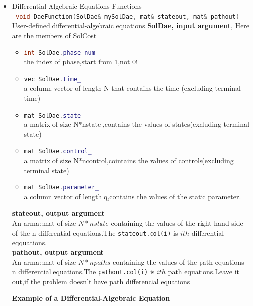 \documentclass[10pt]{article}
\begin{document}
\begin{itemize}
\begin{frame}
\begin{lstlisting}
				}
			\end{lstlisting}
			It is noted in the above function call that the third argument in the
			command {\bf dot} takes the dot product across the {\em rows}, thereby
			producing a {\em column vector}.
		\end{frame}
		\item Differential-Algebraic Equations Functions\\
		\lstinline[language=C++]| void DaeFunction(SolDae& mySolDae, mat& stateout, mat& pathout)|\\
		User-defined differential-algebraic equations
		\textbf{SolDae, input argument}, Here are the members of SolCost 
		\begin{itemize}
			\item \lstinline[language=C++]|int SolDae.phase_num_|\\the index of phase,start from 1,not 0!
			\item \lstinline[language=C++]|vec SolDae.time_|\\a column vector of length N that contains the time (excluding terminal time)
			\item \lstinline[language=C++]|mat SolDae.state_| \\ a matrix of size N*nstate ,contains the values of states(excluding terminal state)
			\item \lstinline[language=C++]|mat SolDae.control_|\\a matrix of size N*ncontrol,cointains the values of controls(excluding terminal state)
			\item \lstinline[language=C++]|mat SolDae.parameter_| \\a column vector of length q,contains the values of the static parameter.
		\end{itemize}
		\textbf{stateout, output argument}\\
	    An arma::mat of size $N*nstate$ containing the values of the right-hand side of the n differential equations.The \lstinline|stateout.col(i)| is $ith$ differential eqquations.\\
		\textbf{pathout, output argument}\\
		 An arma::mat of size $N*npaths$ containing the values of the path equations n differential equations.The \lstinline|pathout.col(i)| is $ith$ path equations.Leave it out,if the problem doesn't have path differencial equations\\
		 \begin{frame}
		 	{\noindent}{\bf Example of a Differential-Algebraic Equation }
		 	

\end{frame}
\end{itemize}
\end{document}
